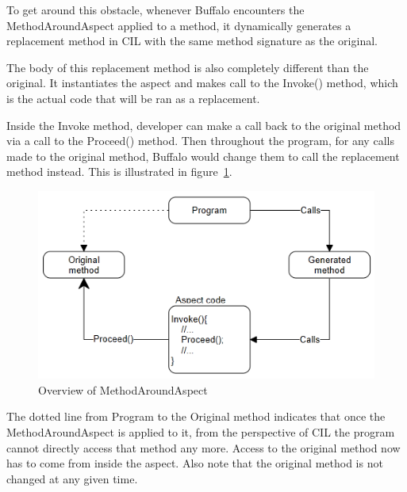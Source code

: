 To get around this obstacle, whenever Buffalo encounters the MethodAroundAspect applied to a method, it dynamically generates a replacement method in CIL with the same method signature as the original.

The body of this replacement method is also completely different than the original. It instantiates the aspect and makes call to the Invoke() method, which is the actual code that will be ran as a replacement. 

Inside the Invoke method, developer can make a call back to the original method via a call to the Proceed() method. Then throughout the program, for any calls made to the original method, Buffalo would change them to call the replacement method instead. This is illustrated in figure~\ref{around_overview}.

\begin{figure}[H]
  \includegraphics[scale=1.0]{AroundOverview3.PNG}
  \centering
  \caption{Overview of MethodAroundAspect\label{around_overview}}
\end{figure}

The dotted line from Program to the Original method indicates that once the MethodAroundAspect is applied to it, from the perspective of CIL the program cannot directly access that method any more. Access to the original method now has to come from inside the aspect. Also note that the original method is not changed at any given time.
